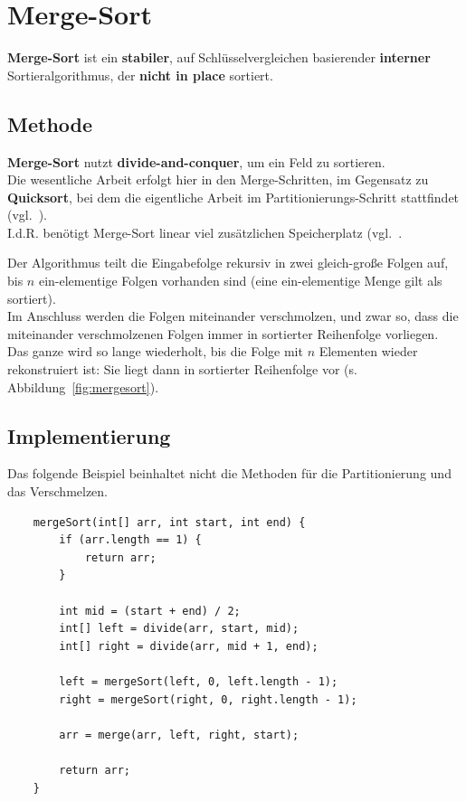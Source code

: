\section{Merge-Sort}

\textbf{Merge-Sort} ist ein \textbf{stabiler}, auf Schlüsselvergleichen basierender \textbf{interner} Sortieralgorithmus, der \textbf{nicht in place} sortiert.

\subsection{Methode}

\textbf{Merge-Sort} nutzt \textbf{divide-and-conquer}, um ein Feld zu sortieren.\\
Die wesentliche Arbeit erfolgt hier in den Merge-Schritten, im Gegensatz zu \textbf{Quicksort}, bei dem die eigentliche Arbeit im Partitionierungs-Schritt stattfindet (vgl.~\cite[174]{GD18e}).\\
I.d.R. benötigt Merge-Sort linear viel zusätzlichen Speicherplatz (vgl.~\cite[112]{OW17b}.

\noindent
Der Algorithmus teilt die Eingabefolge rekursiv in zwei gleich-große Folgen auf, bis $n$ ein-elementige Folgen vorhanden sind (eine ein-elementige Menge gilt als sortiert).\\
Im Anschluss werden die Folgen miteinander verschmolzen, und zwar so, dass die miteinander verschmolzenen Folgen immer in sortierter Reihenfolge vorliegen.\\
Das ganze wird so lange wiederholt, bis die Folge mit $n$ Elementen wieder rekonstruiert ist: Sie liegt dann in sortierter Reihenfolge vor (s. Abbildung~\ref{fig:mergesort}).\\


\subsection{Implementierung}

Das folgende Beispiel beinhaltet nicht die Methoden für die Partitionierung und das Verschmelzen.

\begin{verbatim}
    mergeSort(int[] arr, int start, int end) {
        if (arr.length == 1) {
            return arr;
        }

        int mid = (start + end) / 2;
        int[] left = divide(arr, start, mid);
        int[] right = divide(arr, mid + 1, end);

        left = mergeSort(left, 0, left.length - 1);
        right = mergeSort(right, 0, right.length - 1);

        arr = merge(arr, left, right, start);

        return arr;
    }

\end{verbatim}

